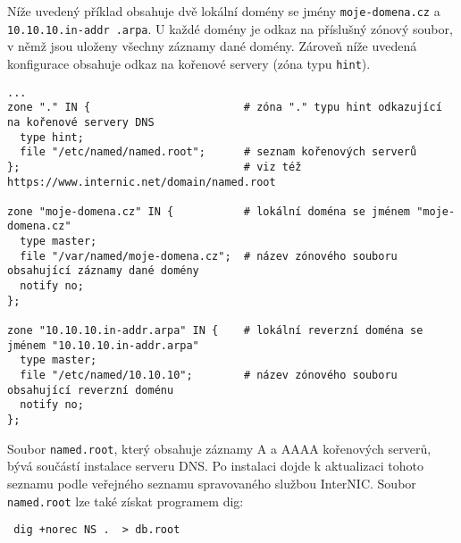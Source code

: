 Níže uvedený příklad obsahuje dvě lokální domény se jmény {\tt moje-domena.cz} a {\tt 10.10.10.in-addr .arpa}. U každé domény je odkaz na příslušný zónový soubor, v němž jsou uloženy všechny záznamy dané domény. Zároveň níže uvedená konfigurace obsahuje odkaz na kořenové servery (zóna typu {\tt hint}). 
{\footnotesize
\begin{verbatim}
...
zone "." IN {                        # zóna "." typu hint odkazující na kořenové servery DNS
  type hint;
  file "/etc/named/named.root";      # seznam kořenových serverů
};                                   # viz též https://www.internic.net/domain/named.root

zone "moje-domena.cz" IN {           # lokální doména se jménem "moje-domena.cz"
  type master;
  file "/var/named/moje-domena.cz";  # název zónového souboru obsahující záznamy dané domény
  notify no;
};

zone "10.10.10.in-addr.arpa" IN {    # lokální reverzní doména se jménem "10.10.10.in-addr.arpa"
  type master;
  file "/etc/named/10.10.10";        # název zónového souboru obsahující reverzní doménu
  notify no;
};

\end{verbatim}
}
%
%
%
Soubor {\tt named.root}, který obsahuje záznamy A a AAAA kořenových serverů, bývá součástí instalace serveru DNS. Po instalaci dojde k aktualizaci tohoto seznamu podle veřejného seznamu spravovaného službou InterNIC. Soubor {\tt named.root} lze také získat programem dig:
\begin{verbatim}
 dig +norec NS .  > db.root
\end{verbatim}

